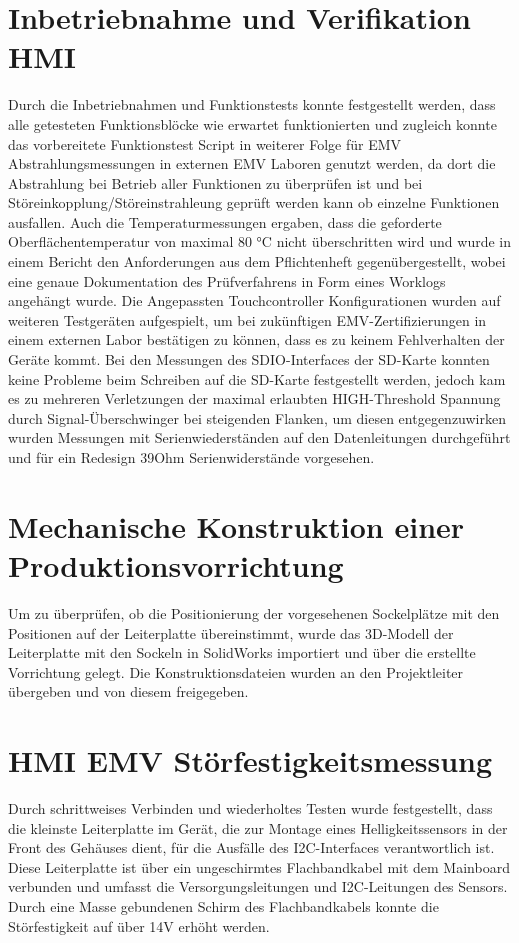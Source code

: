 \documentclass[praktikum,german]{hgbthesis}
\begin{document}
\section{Inbetriebnahme und Verifikation HMI}
Durch die Inbetriebnahmen und Funktionstests konnte festgestellt werden, dass alle getesteten Funktionsblöcke wie erwartet funktionierten und zugleich konnte das vorbereitete Funktionstest Script in weiterer Folge für EMV Abstrahlungsmessungen in externen EMV Laboren genutzt werden, da dort die Abstrahlung bei Betrieb aller Funktionen zu überprüfen ist und bei Störeinkopplung/Störeinstrahleung geprüft werden kann ob einzelne Funktionen ausfallen.
Auch die Temperaturmessungen ergaben, dass die geforderte Oberflächentemperatur von maximal 80 °C nicht überschritten wird und wurde in einem Bericht den Anforderungen aus dem Pflichtenheft gegenübergestellt, wobei eine genaue Dokumentation des Prüfverfahrens in Form eines Worklogs angehängt wurde.
Die Angepassten Touchcontroller Konfigurationen wurden auf weiteren Testgeräten aufgespielt, um bei zukünftigen EMV-Zertifizierungen in einem externen Labor bestätigen zu können, dass es zu keinem Fehlverhalten der Geräte kommt. Bei den Messungen des SDIO-Interfaces der SD-Karte konnten keine Probleme beim Schreiben auf die SD-Karte festgestellt werden, jedoch kam es zu mehreren Verletzungen der maximal erlaubten HIGH-Threshold Spannung durch Signal-Überschwinger bei steigenden Flanken, um diesen entgegenzuwirken wurden Messungen mit Serienwiederständen auf den Datenleitungen durchgeführt und für ein Redesign 39Ohm Serienwiderstände vorgesehen.

\section{Mechanische Konstruktion einer Produktionsvorrichtung}
Um zu überprüfen, ob die Positionierung der vorgesehenen Sockelplätze mit den Positionen auf der Leiterplatte übereinstimmt, wurde das 3D-Modell der Leiterplatte mit den Sockeln in SolidWorks importiert und über die erstellte Vorrichtung gelegt. Die Konstruktionsdateien wurden an den Projektleiter übergeben und von diesem freigegeben.

\section{HMI EMV Störfestigkeitsmessung}
Durch schrittweises Verbinden und wiederholtes Testen wurde festgestellt, dass die kleinste Leiterplatte im Gerät, die zur Montage eines Helligkeitssensors in der Front des Gehäuses dient, für die Ausfälle des I2C-Interfaces verantwortlich ist. Diese Leiterplatte ist über ein ungeschirmtes Flachbandkabel mit dem Mainboard verbunden und umfasst die Versorgungsleitungen und I2C-Leitungen des Sensors. Durch eine Masse gebundenen Schirm des Flachbandkabels konnte die Störfestigkeit auf über 14V erhöht werden.
\end{document}
